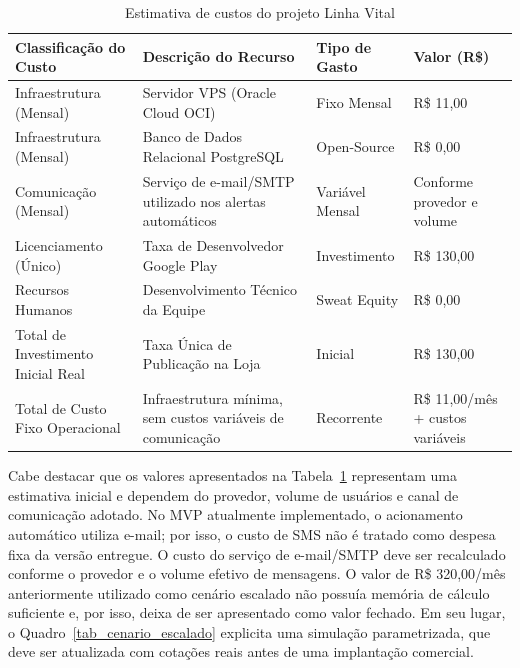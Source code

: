 \begin{table}[H]
\caption{Estimativa de custos do projeto Linha Vital}
\label{tab_custos}
\centering
\footnotesize

\begin{tabular}{|p{4cm}|p{5cm}|p{3cm}|p{2.5cm}|}
\hline
\textbf{Classificação do Custo} & \textbf{Descrição do Recurso} & \textbf{Tipo de Gasto} & \textbf{Valor (R\$)} \\
\hline

Infraestrutura (Mensal) &
Servidor VPS (Oracle Cloud OCI) &
Fixo Mensal &
R\$ 11,00 \\
\hline

Infraestrutura (Mensal) &
Banco de Dados Relacional PostgreSQL &
Open-Source &
R\$ 0,00 \\
\hline

Comunicação (Mensal) &
Serviço de e-mail/SMTP utilizado nos alertas automáticos &
Variável Mensal &
Conforme provedor e volume \\
\hline

Licenciamento (Único) &
Taxa de Desenvolvedor Google Play &
Investimento &
R\$ 130,00 \\
\hline

Recursos Humanos &
Desenvolvimento Técnico da Equipe &
Sweat Equity &
R\$ 0,00 \\
\hline

Total de Investimento Inicial Real &
Taxa Única de Publicação na Loja &
Inicial &
R\$ 130,00 \\
\hline

Total de Custo Fixo Operacional &
Infraestrutura mínima, sem custos variáveis de comunicação &
Recorrente &
R\$ 11,00/mês + custos variáveis \\
\hline

\end{tabular}

\normalsize

\end{table}

Cabe destacar que os valores apresentados na Tabela~\ref{tab_custos} representam uma estimativa inicial e dependem do provedor, volume de usuários e canal de comunicação adotado. No MVP atualmente implementado, o acionamento automático utiliza e-mail; por isso, o custo de SMS não é tratado como despesa fixa da versão entregue. O custo do serviço de e-mail/SMTP deve ser recalculado conforme o provedor e o volume efetivo de mensagens. O valor de R\$ 320,00/mês anteriormente utilizado como cenário escalado não possuía memória de cálculo suficiente e, por isso, deixa de ser apresentado como valor fechado. Em seu lugar, o Quadro~\ref{tab_cenario_escalado} explicita uma simulação parametrizada, que deve ser atualizada com cotações reais antes de uma implantação comercial.

